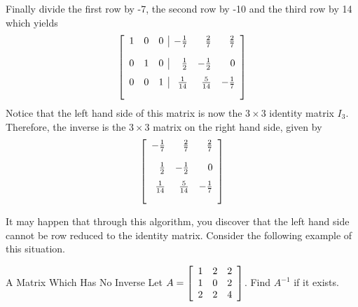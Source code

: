 \begin{solution}
Finally divide the first row by -7, the second row by -10 and the third row
by 14 which yields
\begin{equation*}
\leftB 
\begin{array}{rrr|rrr}
1 & 0 & 0 & -\vspace{0.05in}\frac{1}{7} & \vspace{0.05in}\frac{2}{7} & \vspace{0.05in}\frac{2}{7} \\
0 & 1 & 0 & \vspace{0.05in}\frac{1}{2} & -\vspace{0.05in}\frac{1}{2} & 0
\\
0 & 0 & 1 & \vspace{0.05in}\frac{1}{14} & \vspace{0.05in}\frac{5}{14} & -
\vspace{0.05in}\frac{1}{7}
\end{array}
\rightB 
\end{equation*}
Notice that the left hand side of this matrix is now the $3 \times 3$ identity matrix $I_3$. 
Therefore, the inverse is the $3 \times 3$ matrix on the right hand side, given by
\begin{equation*}
\leftB
\begin{array}{rrr}
-\vspace{0.05in}\frac{1}{7} & \vspace{0.05in}\frac{2}{7} & \vspace{0.05in}
\frac{2}{7} \\
\vspace{0.05in}\frac{1}{2} & -\vspace{0.05in}\frac{1}{2} & 0 \\
\vspace{0.05in}\frac{1}{14} & \vspace{0.05in}\frac{5}{14} & -\vspace{0.05in}
\frac{1}{7}
\end{array}
\rightB
\end{equation*}
\end{solution}

It may happen that through this algorithm, you discover that the left hand side cannot 
be row reduced to the identity matrix. Consider the following example of this situation. 

\begin{example}{A Matrix Which Has No Inverse}\label{exa:matrixnoinverse}
Let $A=\left[
\begin{array}{rrr}
1 & 2 & 2 \\
1 & 0 & 2 \\
2 & 2 & 4
\end{array}
\right] $. Find $A^{-1}$ if it exists.
\end{example}

